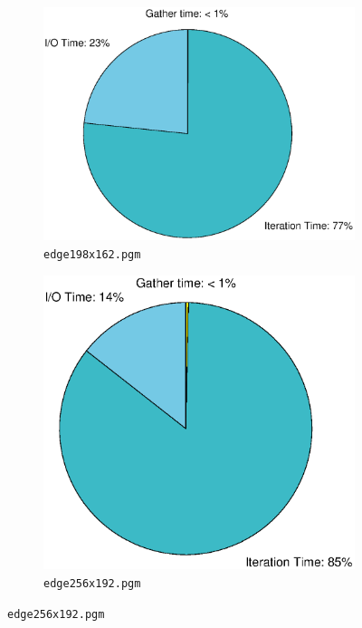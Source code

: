\documentclass{article} %
\begin{document}
\begin{figure}
\begin{subfigure}[b]{.4\textwidth}
    \centering
    \includegraphics[width=\textwidth]{figures/shares198_1.eps}
    \caption{\texttt{edge198x162.pgm}}
    \label{fig:shares1}
\end{subfigure}
\hfill
\begin{subfigure}[b]{.4\textwidth}
    \centering
    \includegraphics[width=\textwidth]{figures/shares198_2}
    \caption{\texttt{edge256x192.pgm}}

\end{subfigure}
\end{figure}
\end{document}
